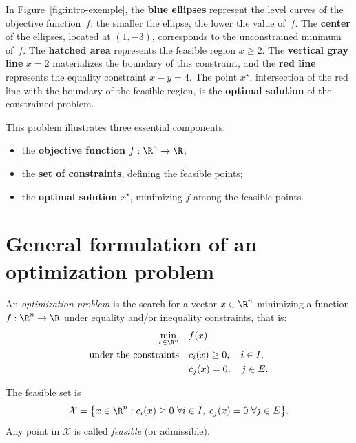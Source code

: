 \begin{figureexplanation}
In Figure~\ref{fig:intro-exemple}, the \textbf{blue ellipses} represent the level curves of the objective function~$f$: the smaller the ellipse, the lower the value of~$f$. The \textbf{center} of the ellipses, located at $(1,-3)$, corresponds to the unconstrained minimum of~$f$. The \textbf{hatched area} represents the feasible region $x \ge 2$. The \textbf{vertical gray line} $x = 2$ materializes the boundary of this constraint, and the \textbf{red line} represents the equality constraint $x - y = 4$. The point $x^\star$, intersection of the red line with the boundary of the feasible region, is the \textbf{optimal solution} of the constrained problem.
\end{figureexplanation}

This problem illustrates three essential components:
\begin{itemize}
  \item the \textbf{objective function} $f : \R^n \to \R$;
  \item the \textbf{set of constraints}, defining the feasible points;
  \item the \textbf{optimal solution} $x^\star$, minimizing $f$ among the feasible points.
\end{itemize}

\section{General formulation of an optimization problem}

\begin{definition}
An \emph{optimization problem} is the search for a vector
$x \in \R^n$ minimizing a function $f : \R^n \to \R$ under equality
and/or inequality constraints, that is:
\begin{equation}
  \begin{aligned}
    \min_{x \in \R^n} \quad & f(x) \\
    \text{under the constraints} \quad &
    c_i(x) \ge 0,\quad i \in I, \\
    & c_j(x) = 0,\quad j \in E.
  \end{aligned}
  \label{eq:general-problem}
\end{equation}
\end{definition}

\begin{definition}
The feasible set is
\[
\mathcal{X} = \bigl\{x \in \R^n : c_i(x)\ge 0\ \forall i\in I,\; c_j(x)=0\ \forall j\in E\bigr\}.
\]
Any point in $\mathcal{X}$ is called \emph{feasible} (or admissible).
\end{definition}

